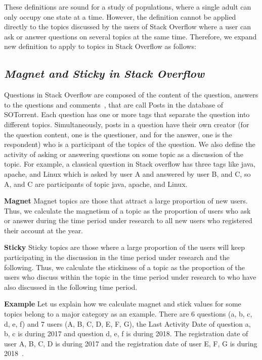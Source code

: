 \documentclass[english,preprint,JIP]{ipsj}
\begin{document}
These definitions are sound for a study of populations, where a single adult can only occupy one state at a time. However, the definition cannot be applied directly to the topics discussed by the users of Stack Overflow where a user can ask or answer questions on several topics at the same time. Therefore, we expand new definition to apply to topics in Stack Overflow as follows:

\smallskip
\subsection*{\textit{\textbf{Magnet and Sticky in Stack Overflow}}}

Questions in Stack Overflow are composed of the content of the question, answers to the questions and comments~\cite{liu2018mining}, that are call Posts in the database of SOTorrent. Each question has one or more tags that separate the question into different topics. Simultaneously, posts in a question have their own creator (for the question content, one is the questioner, and for the answer, one is the respondent) who is a participant of the topics of the question. We also define the activity of asking or answering questions on some topic as a discussion of the topic. For example, a classical question in Stack overflow has three tags like java, apache, and Linux which is asked by user A and answered by user B, and C, so A, and C are participants of topic java, apache, and Linux.

\smallskip
\noindent
\textbf{Magnet}
Magnet topics are those that attract a large proportion of new users. Thus, we calculate the magnetism of a topic as the proportion of users who ask or answer during the time period under research to all new users who registered their account at the year.

\smallskip
\noindent
\textbf{Sticky}
Sticky topics are those where a large proportion of the users will keep participating in the discussion in the time period under research and the following. Thus, we calculate the stickiness of a topic as the proportion of the users who discuss within the topic in the time period under research to who have also discussed in the following time period.

\smallskip
\noindent
\textbf{Example}
Let us explain how we calculate magnet and stick values for some topics belong to a major category as an example. There are 6 questions (a, b, c, d, e, f) and 7 users (A, B, C, D, E, F, G), the Last Activity Date of question a, b, c is during 2017 and question d, e, f is during 2018. The registration date of user A, B, C, D is during 2017 and the registration date of user E, F, G is during 2018~\cite{yamashita2016magnet}.
\end{document}
